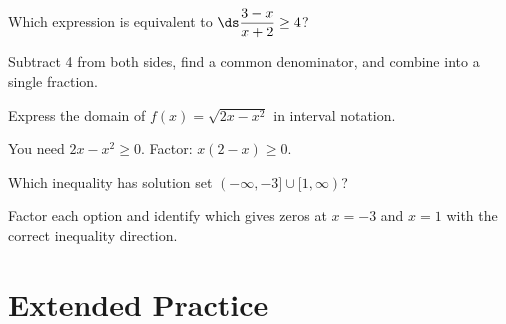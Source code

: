 \documentclass{ximera}
\begin{document}
\begin{problem}
Which expression is equivalent to $\ds\dfrac{3-x}{x+2}\geq 4$?
\begin{hint}
Subtract 4 from both sides, find a common denominator, and combine into a single fraction.
\end{hint}
\begin{multipleChoice}
\end{multipleChoice}
\end{problem}

\begin{problem}
Express the domain of $f(x)=\sqrt{2x-x^2}$ in interval notation.
\begin{hint}
You need $2x-x^2 \geq 0$. Factor: $x(2-x) \geq 0$.
\end{hint}
\begin{multipleChoice}
  \choice{$[0,\infty)$}
  \choice[correct]{$[0,2]$}
  \choice{$(-\infty,0]\cup[2,\infty)$}
\end{multipleChoice}
\end{problem}

\begin{problem}
Which inequality has solution set $(-\infty,-3]\cup[1,\infty)$?
\begin{hint}
Factor each option and identify which gives zeros at $x=-3$ and $x=1$ with the correct inequality direction.
\end{hint}
\begin{multipleChoice}
\end{multipleChoice}
\end{problem}


\bigskip
\section*{Extended Practice}
\end{document}

